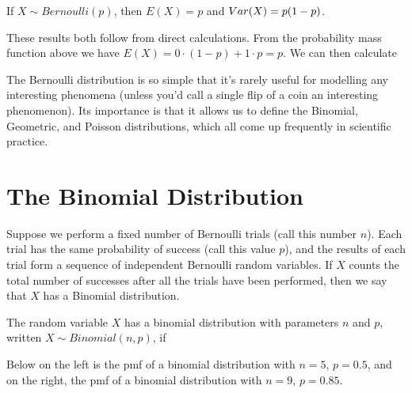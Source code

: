 \begin{center}
\end{center}

\begin{thm}\label{BernoulliExpectation} If $X \sim Bernoulli(p)$, then $E(X) = p$ and $Var(X) = p(1-p)$.
\end{thm}

\begin{pf} These results both follow from direct calculations. From the probability mass function above we have $E(X) = 0 \cdot (1-p) + 1 \cdot p  = p$. We can then calculate
\end{pf}
\par
The Bernoulli distribution is so simple that it's rarely useful for modelling any interesting phenomena (unless you'd call a single flip of a coin an interesting phenomenon). Its importance is that it allows us to define the Binomial, Geometric, and Poisson distributions, which all come up frequently in scientific practice.

\section{The Binomial Distribution}

Suppose we perform a fixed number of Bernoulli trials (call this number $n$). Each trial has the same probability of success (call this value $p$), and the results of each trial form a sequence of independent Bernoulli random variables. If $X$ counts the total number of successes after all the trials have been performed, then we say that $X$ has a Binomial distribution.

\begin{defn} The random variable $X$ has a binomial distribution with parameters $n$ and $p$, written $X \sim Binomial(n,p)$, if
\renewcommand*{\arraystretch}{1.35}
\renewcommand*{\arraystretch}{1}
\end{defn}
\par
Below on the left is the pmf of a binomial distribution with $n = 5$, $p = 0.5$, and on the right, the pmf of a binomial distribution with $n = 9$, $p = 0.85$.

